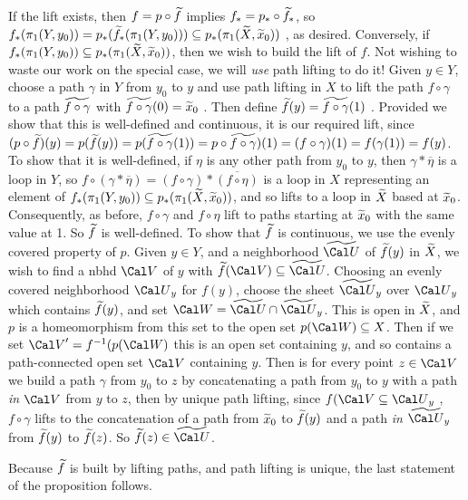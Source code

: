 If the lift exists, then $f=p\circ\widetilde{f}$ implies 
$f_*=p_*\circ\widetilde{f}_*$, so 
$f_*(\pi_1(Y,y_0)) = p_*(\widetilde{f}_*(\pi_1(Y,y_0)))\subseteq p_*(\pi_1(\widetilde{X},\widetilde{x}_0))$ , as desired.
Conversely, if $f_*(\pi_1(Y,y_0))\subseteq p_*(\pi_1(\widetilde{X},\widetilde{x}_0))$,
then we wish to build the lift of $f$. Not wishing to waste our work on the
special case, we will {\it use} path lifting to do it! Given $y\in Y$,
choose a path $\gamma$ in $Y$ from $y_0$ to $y$ and use path
lifting in $X$ to lift the path $f\circ\gamma$ to a path $\widetilde{f\circ\gamma}$ with 
$\widetilde{f\circ\gamma}(0)=\widetilde{x}_0$ . Then define
$\widetilde{f}(y)=\widetilde{f\circ\gamma}(1)$ . Provided we show that
this is well-defined and continuous, it is our required lift, 
since $(p\circ\widetilde{f})(y) = p(\widetilde{f}(y))=p(\widetilde{f\circ\gamma}(1))
=p\circ\widetilde{f\circ\gamma})(1) = (f\circ\gamma)(1) = f(\gamma(1)) = f(y)$. 
To show that it
is well-defined, if $\eta$ is any other path from 
$y_0$ to $y$, then $\gamma*\overline{\eta}$ is a loop in $Y$, 
so $f\circ(\gamma*\overline{\eta})=(f\circ\gamma)*\overline{(f\circ\eta)}$
is a loop in $X$ representing an element of 
$f_*(\pi_1(Y,y_0))\subseteq p_*(\pi_1(\widetilde{X},\widetilde{x}_0))$, and
so lifts to a loop in $\widetilde{X}$ based at $\widetilde{x}_0$.
Consequently, as before, $f\circ\gamma$ and $f\circ\eta$ lift to paths
starting at $\widetilde{x}_0$ with the same value at 1. So $\widetilde{f}$ is
well-defined.  To show that $\widetilde{f}$ is continuous, we use the 
evenly covered property of $p$. Given $y\in Y$,
and  a neighborhood $\wtl{\Cal U}$ of 
$\widetilde{f}(y)$ in $\widetilde{X}$, 
we wish to find a nbhd ${\Cal V}$ of $y$ with 
$\wtl{f}({\Cal V})\sset\wtl{\Cal U}$. Choosing an evenly covered 
neighborhood ${\Cal U}_y$ for $f(y)$, choose the sheet 
$\wtl{\Cal U}_y$ over ${\Cal U}_y$ which contains $\widetilde{f}(y)$,
and set ${\Cal W}=\wtl{\Cal U}\cap \wtl{\Cal U}_y$. This is open in 
$\widetilde{X}$, and $p$ is a homeomorphism from this 
set to the open set $p({\Cal W})\sset X$. Then if we set ${\Cal V}^\prime= f\inv(p({\Cal W})$
this is an open set containing $y$, and so contains a path-connected open 
set ${\Cal V}$ containing $y$. Then is for every point $z\in {\Cal V}$ we build a path
$\gamma$
from $y_0$ to $z$ by concatenating a path from $y_0$ to $y$ with a path {\it in} ${\Cal V}$
from $y$ to $z$, then by unique path lifting, 
since $f({\Cal V}\sset {\Cal U}_y$ , $f\circ\gamma$ lifts to 
the concatenation of a path from $\widetilde{x}_0$ to $\widetilde{f}(y)$ and a 
path {\it in} $\wtl{\Cal U}_y$ from $\widetilde{f}(y)$ to $\widetilde{f}(z)$.
So $\wtl{f}(z)\in\wtl{\Cal U}$.

\ssk

Because $\widetilde{f}$ is built by lifting paths, and path
lifting is unique, the last statement of the proposition follows.

